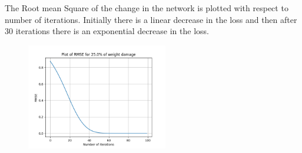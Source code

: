 \documentclass{article}
\begin{document}
\begin{figure}[H]
\hspace{0.001\textwidth}
\end{figure}


The Root mean Square of the change in the network is plotted with respect to number of iterations. Initially there is a linear decrease in the loss and then after 30 iterations there is an exponential decrease in the loss.
\begin{figure}[H]
\includegraphics[width=0.55\textwidth]{Mona_22.png}
\centering
\end{figure}
\end{document}
